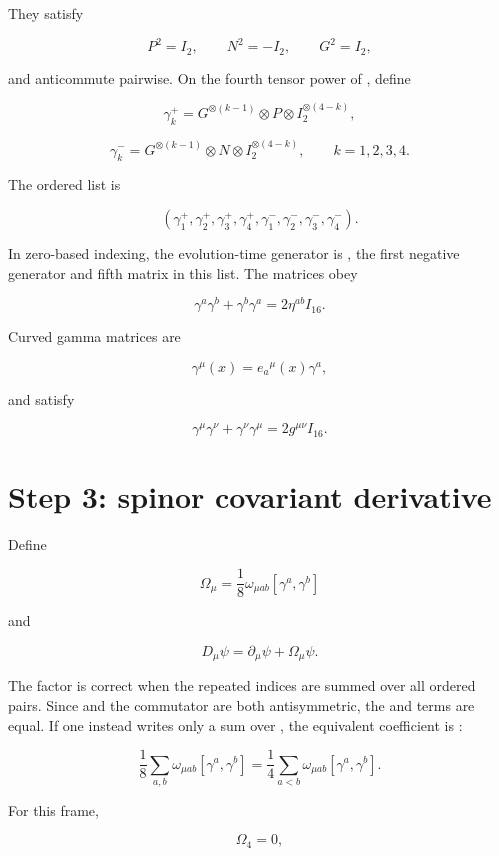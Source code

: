 \documentclass[11pt]{article}
\begin{document}
They satisfy

\[
P^2=I_2,
\qquad N^2=-I_2,
\qquad G^2=I_2,
\]

and anticommute pairwise. On the fourth tensor power of \texttt{}, define

\[
\gamma_k^+=G^{\otimes(k-1)}\otimes P\otimes I_2^{\otimes(4-k)},
\]

\[
\gamma_k^-=G^{\otimes(k-1)}\otimes N\otimes I_2^{\otimes(4-k)},
\qquad k=1,2,3,4.
\]

The ordered list is

\[
(\gamma_1^+,\gamma_2^+,\gamma_3^+,\gamma_4^+,
 \gamma_1^-,\gamma_2^-,\gamma_3^-,\gamma_4^-).
\]

In zero-based indexing, the evolution-time generator is \texttt{}, the first negative generator and fifth matrix in this list. The matrices obey

\[
\gamma^a\gamma^b+\gamma^b\gamma^a=2\eta^{ab}I_{16}.
\]

Curved gamma matrices are

\[
\gamma^\mu(x)=e_a{}^\mu(x)\gamma^a,
\]

and satisfy

\[
\gamma^\mu\gamma^\nu+\gamma^\nu\gamma^\mu
=2g^{\mu\nu}I_{16}.
\]

\section{Step 3: spinor covariant derivative}

Define

\[
\Omega_\mu
=\frac18\omega_{\mu ab}[\gamma^a,\gamma^b]
\]

and

\[
\boxed{D_\mu\psi=\partial_\mu\psi+\Omega_\mu\psi.}
\]

The factor \texttt{} is correct when the repeated indices \texttt{} are summed over all ordered pairs. Since \texttt{} and the commutator are both antisymmetric, the \texttt{} and \texttt{} terms are equal. If one instead writes only a sum over \texttt{}, the equivalent coefficient is \texttt{}:

\[
\frac18\sum_{a,b}\omega_{\mu ab}[\gamma^a,\gamma^b]
=\frac14\sum_{a<b}\omega_{\mu ab}[\gamma^a,\gamma^b].
\]

For this frame,

\[
\Omega_4=0,
\]
\end{document}
